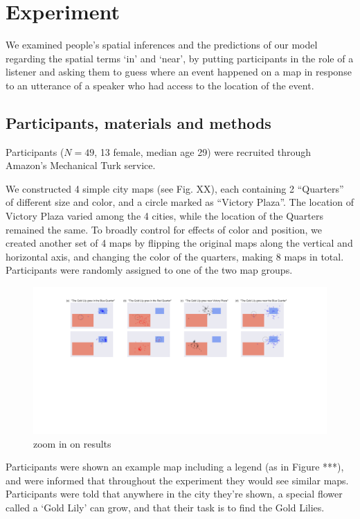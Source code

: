 \documentclass[10pt,letterpaper]{article}
\begin{document}
\section{Experiment}\label{sec:exps}

We examined people's spatial inferences and the predictions of our model regarding the spatial terms `in' and `near', by putting participants in the role of a listener and asking them to guess where an event happened on a map in response to an utterance of a speaker who had access to the location of the event. 

\subsection{Participants, materials and methods}

Participants ($N=49$, 13 female, median age 29) were recruited through Amazon's Mechanical Turk service. 

We constructed 4 simple city maps (see Fig. XX), each containing 2 ``Quarters'' of different size and color, and a circle marked as ``Victory Plaza''. The location of Victory Plaza varied among the 4 cities, while the location of the Quarters remained the same. To broadly control for effects of color and position, we created another set of 4 maps by flipping the original maps along the vertical and horizontal axis, and changing the color of the quarters, making 8 maps in total. Participants were randomly assigned to one of the two map groups. 

\begin{figure}[!t]
\center
\includegraphics[width=\textwidth]{figures/results1.pdf}
\caption{zoom in on results}
\label{fig:zoomIn}
\end{figure}

Participants were shown an example map including a legend (as in Figure ***), and were informed that throughout the experiment they would see similar maps. Participants were told that anywhere in the city they're shown, a special flower called a `Gold Lily' can grow, and that their task is to find the Gold Lilies. 
\end{document}
